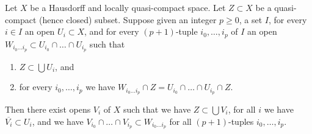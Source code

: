 \begin{lemma}
\label{lemma-lift-covering-of-a-closed}
Let $X$ be a Hausdorff and locally quasi-compact space.
Let $Z \subset X$ be a quasi-compact (hence closed) subset.
Suppose given an integer $p \geq 0$, a set $I$, for every $i \in I$
an open $U_i \subset X$, and for every $(p + 1)$-tuple
$i_0, \ldots, i_p$ of $I$ an open
$W_{i_0 \ldots i_p} \subset U_{i_0} \cap \ldots \cap U_{i_p}$
such that
\begin{enumerate}
\item $Z \subset \bigcup U_i$, and
\item for every $i_0, \ldots, i_p$ we have
$W_{i_0 \ldots i_p} \cap Z = U_{i_0} \cap \ldots \cap U_{i_p} \cap Z$.
\end{enumerate}
Then there exist opens $V_i$ of $X$ such that
we have $Z \subset \bigcup V_i$,
for all $i$ we have $\overline{V_i} \subset U_i$, and
we have $V_{i_0} \cap \ldots \cap V_{i_p} \subset W_{i_0 \ldots i_p}$
for all $(p + 1)$-tuples $i_0, \ldots, i_p$.
\end{lemma}

